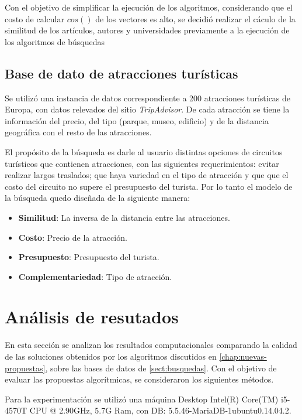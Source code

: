 Con el objetivo de simplificar la ejecución de los algoritmos, considerando que el costo de calcular $cos()$ de los vectores es alto, se decidió realizar el cáculo de la similitud de los artículos, autores y universidades previamente a la ejecución de los algoritmos de búsquedas

\subsection{Base de dato de atracciones turísticas}
Se utilizó una instancia de datos correspondiente a 200 atracciones turísticas de Europa, con datos relevados del sitio \textit{TripAdvisor}. De cada atracción se tiene la información del precio, del tipo (parque, museo, edificio) y de la distancia geográfica con el resto de las atracciones.

El propósito de la búsqueda es darle al usuario distintas opciones de circuitos turísticos que contienen atracciones, con las siguientes requerimientos: evitar realizar largos traslados; que haya variedad en el tipo de atracción y que que el costo del circuito no supere el presupuesto del turista. Por lo tanto el modelo de la búsqueda quedo diseñada de la siguiente manera:

\begin{itemize}
	\item \textbf{Similitud}: La inversa de la distancia entre las atracciones. 
	\item \textbf{Costo}: Precio de la atracción. 
	\item \textbf{Presupuesto}: Presupuesto del turista. 
	\item \textbf{Complementariedad}: Tipo de atracción.
\end{itemize}

\section{Análisis de resutados}\label{sect:resultados}

En esta sección se analizan los resultados computacionales comparando la calidad de las soluciones obtenidos por los algoritmos discutidos en \autoref{chap:nuevas-propuestas}, sobre las bases de datos de \autoref{sect:busquedas}. Con el objetivo de evaluar las propuestas algorítmicas, se consideraron los siguientes métodos.

Para la experimentación se utilizó una máquina Desktop Intel(R) Core(TM) i5-4570T CPU @ 2.90GHz, 5.7G Ram, con DB: 5.5.46-MariaDB-1ubuntu0.14.04.2.

